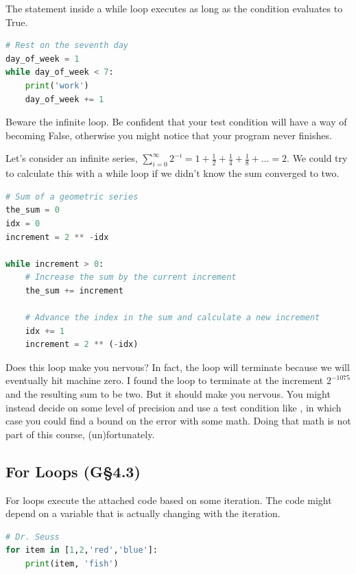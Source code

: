The statement inside a while loop executes as long as the condition evaluates to True.

\begin{lstlisting}[language = Python]
# Rest on the seventh day
day_of_week = 1
while day_of_week < 7:
    print('work')
    day_of_week += 1 \end{lstlisting}


Beware the infinite loop. Be confident that your test condition will have a way of becoming False, otherwise
you might notice that your program never finishes. 


Let's consider an infinite series, $\sum_{i=0}^\infty 2^{-i} =  1 + \frac{1}{2} + \frac{1}{4} + \frac{1}{8} + \dots = 2$.
We could try to calculate this with a while loop if we didn't know the sum converged to two.

\begin{lstlisting}[language = Python]
# Sum of a geometric series
the_sum = 0
idx = 0
increment = 2 ** -idx

while increment > 0:
    # Increase the sum by the current increment
    the_sum += increment
    
    # Advance the index in the sum and calculate a new increment
    idx += 1
    increment = 2 ** (-idx) \end{lstlisting}
    

Does this loop make you nervous? In fact, the loop will terminate because we will eventually hit machine zero.
I found the loop to terminate at the increment $2^{-1075}$ and the resulting sum to be two. But it should make you nervous.
You might instead decide on some level of precision and use a test condition like 
, in which case you could find a bound on the error with some math.
Doing that math is not part of this course, (un)fortunately.


\subsection{For Loops (G\S4.3)} 
\label{sec:forloop}

For loops execute the attached code based on some iteration. The code might depend on a variable that is actually changing
with the iteration. 

\begin{lstlisting}[language = Python]
# Dr. Seuss
for item in [1,2,'red','blue']:
    print(item, 'fish')  \end{lstlisting}



